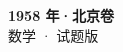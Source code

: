 \documentclass[zihao=-4, a4paper]{ctexart}
\begin{document}
\begin{center}
  {\Large\bfseries 1958 年·北京卷}\\[4pt]
  {\large 数学 · 试题版}
\end{center}
\medskip
{}

\end{document}
